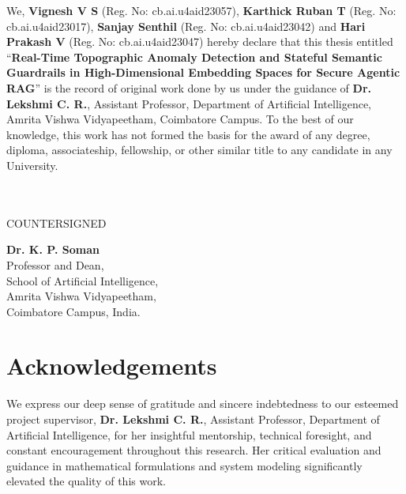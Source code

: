 \documentclass[a4paper, 12pt]{report}
\theoremstyle{definition}
\begin{document}
	\noindent We, \textbf{Vignesh V S} (Reg. No: cb.ai.u4aid23057), \textbf{Karthick Ruban T} (Reg. No: cb.ai.u4aid23017), \textbf{Sanjay Senthil} (Reg. No: cb.ai.u4aid23042) and \textbf{Hari Prakash V} (Reg. No: cb.ai.u4aid23047) hereby declare that this thesis entitled \enquote{\textbf{Real-Time Topographic Anomaly Detection and Stateful Semantic Guardrails in High-Dimensional Embedding Spaces for Secure Agentic RAG}} is the record of original work done by us under the guidance of \textbf{Dr. Lekshmi C. R.}, Assistant Professor, Department of Artificial Intelligence, Amrita Vishwa Vidyapeetham, Coimbatore Campus. To the best of our knowledge, this work has not formed the basis for the award of any degree, diploma, associateship, fellowship, or other similar title to any candidate in any University.\\\\
	
	\vspace*{1cm}
	 \\
	\vfill
	\begin{center}
		\large{COUNTERSIGNED}\\
	\end{center}
	\vspace{0.4in}
	
\begin{center}
	\textbf{Dr. K. P. Soman}\\
	Professor and Dean, \\ 
	School of Artificial Intelligence, \\ 
	Amrita Vishwa Vidyapeetham,\\
	Coimbatore Campus, India.
\end{center}
	
	\clearpage
	\tableofcontents
	
	\chapter*{Acknowledgements}
	We express our deep sense of gratitude and sincere indebtedness to our esteemed project supervisor, \textbf{Dr. Lekshmi C. R.}, Assistant Professor, Department of Artificial Intelligence, for her insightful mentorship, technical foresight, and constant encouragement throughout this research. Her critical evaluation and guidance in mathematical formulations and system modeling significantly elevated the quality of this work.
	
\end{document}
